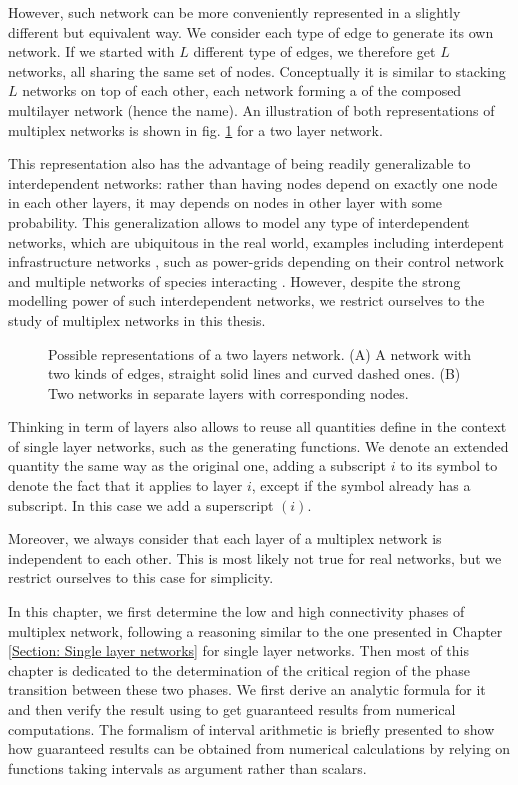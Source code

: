 \documentclass[
11pt, %
american, %
singlespacing, %
final, %
nolistspacing, %
liststotoc, %
headsepline, %
]{MastersDoctoralThesis} %
\begin{document}
However, such network can be more conveniently represented in a slightly different but equivalent way. We consider each type of edge to generate its own network. If we started with $L$ different type of edges, we therefore get $L$ networks, all sharing the same set of nodes. Conceptually it is similar to stacking $L$ networks on top of each other, each network forming a  of the composed multilayer network (hence the name). An illustration of both representations of multiplex networks is shown in fig. \ref{Figure: Representations of multiplex networks} for a two layer network.

This representation also has the advantage of being readily generalizable to interdependent networks: rather than having nodes depend on exactly one node in each other layers, it may depends on nodes in other layer with some probability. This generalization allows to model any type of interdependent networks, which are ubiquitous in the real world, examples including interdepent infrastructure networks \cite{rinaldi2001identifying}, such as power-grids depending on their control network \cite{buldyrev2010catastrophic} and multiple networks of species interacting \cite{pocock2012robustness}. However, despite the strong modelling power of such interdependent networks, we restrict ourselves to the study of multiplex networks in this thesis.

\begin{figure}
	
	\caption{Possible representations of a two layers network. (A) A network with two kinds of edges, straight solid lines and curved dashed ones. (B) Two networks in separate layers with corresponding nodes.}
	\label{Figure: Representations of multiplex networks}
\end{figure}

Thinking in term of layers also allows to reuse all quantities define in the context of single layer networks, such as the generating functions. We denote an extended quantity the same way as the original one, adding a subscript $i$ to its symbol to denote the fact that it applies to layer $i$, except if the symbol already has a subscript. In this case we add a superscript $(i)$.

Moreover, we always consider that each layer of a multiplex network is independent to each other. This is most likely not true for real networks, but we restrict ourselves to this case for simplicity.

In this chapter, we first determine the low and high connectivity phases of multiplex network, following a reasoning similar to the one presented in Chapter \ref{Section: Single layer networks} for single layer networks. Then most of this chapter is dedicated to the determination of the critical region of the phase transition between these two phases. We first derive an analytic formula for it and then verify the result using  to get guaranteed results from numerical computations. The formalism of interval arithmetic is briefly presented to show how guaranteed results can be obtained from numerical calculations by relying on functions taking intervals as argument rather than scalars.
\end{document}
